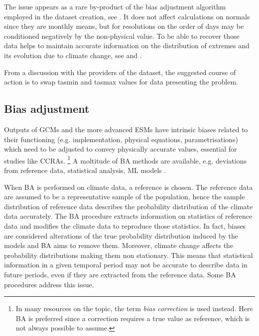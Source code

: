 The issue appears as a rare by-product of the bias adjustment algorithm employed in the dataset creation, see \cite{2012ThrasherTechnicalNote}. It does not affect calculations on \glspl{normal} since they are monthly means, but for resolutions on the order of days may be conditioned negatively by the non-physical value. To be able to recover those data helps to maintain accurate information on the distribution of extremes and its evolution due to climate change, see \cite[1536-1537]{2021SeneviratneWeatherAnd} and \cite[40-42]{2012FieldManagingThe}.

From a discussion with the providers of the dataset, the suggested course of action is to swap \gls{tasmin} and \gls{tasmax} values for data presenting the problem.



\subsection{Bias adjustment}
Outputs of \glspl{GCM} and the more advanced \glspl{ESM} have intrinsic biases related to their functioning (e.g. implementation, physical equations, parametrisations) which need to be adjusted to convey physically accurate values, essential for studies like \glspl{CCRA}.%
\footnote{In many resources on the topic, the term \emph{bias correction} is used instead. Here \gls{BA} is preferred since a correction requires a true value as reference, which is not always possible to assume.}
A moltitude of \gls{BA} methods are available, e.g. deviations from reference data, statistical analysis, \gls{ML} models \cite{2015CannonBiasCorrection,2010PianiStatisticalBias12,2023NiazkarBiasCorrection}.

When \gls{BA} is performed on climate data, a reference is chosen. The reference data are assumed to be a representative sample of the population, hence the sample distribution of reference data describes the probability distribution of the climate data accurately. The \gls{BA} procedure extracts information on statistics of reference data and modifies the climate data to reproduce those statistics. In fact, biases are considered alterations of the true probability distribution induced by the models and \gls{BA} aims to remove them.
Moreover, climate change affects the probability distributions making them non stationary. This means that statistical information in a given temporal period may not be accurate to describe data in future periods, even if they are extracted from the reference data. Some \gls{BA} procedures address this issue.

